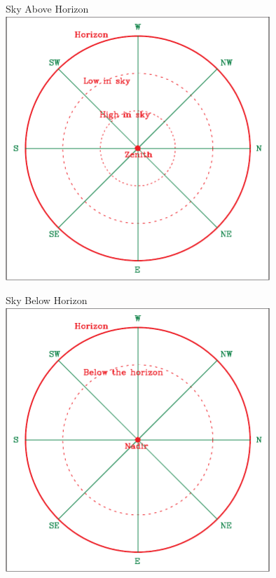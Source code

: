 \documentclass[12pt]{article}
\begin{document}
\begin{minipage}{0.5\textwidth}
	\begin{center}
		\large Sky Above Horizon\\
		\includegraphics[width=0.75\textwidth]{topsky-crop.pdf}
	\end{center}
\end{minipage}
\begin{minipage}{0.5\textwidth}
	\begin{center}
		\large Sky Below Horizon\\
		\includegraphics[width=0.75\textwidth]{botsky-crop.pdf}
	\end{center}
\end{minipage}
\bigskip
\end{document}

